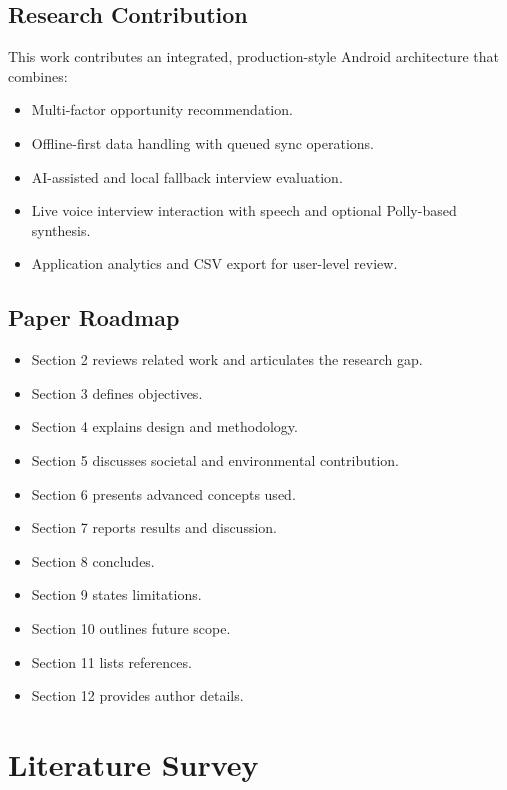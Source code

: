 \documentclass[conference]{IEEEtran}
\begin{document}
\subsection{Research Contribution}

This work contributes an integrated, production-style Android architecture that combines:

\begin{itemize}
  \item Multi-factor opportunity recommendation.
  \item Offline-first data handling with queued sync operations.
  \item AI-assisted and local fallback interview evaluation.
  \item Live voice interview interaction with speech and optional Polly-based synthesis.
  \item Application analytics and CSV export for user-level review.
\end{itemize}

\subsection{Paper Roadmap}

\begin{itemize}
  \item Section 2 reviews related work and articulates the research gap.
  \item Section 3 defines objectives.
  \item Section 4 explains design and methodology.
  \item Section 5 discusses societal and environmental contribution.
  \item Section 6 presents advanced concepts used.
  \item Section 7 reports results and discussion.
  \item Section 8 concludes.
  \item Section 9 states limitations.
  \item Section 10 outlines future scope.
  \item Section 11 lists references.
  \item Section 12 provides author details.
\end{itemize}

\section{Literature Survey}
\end{document}
